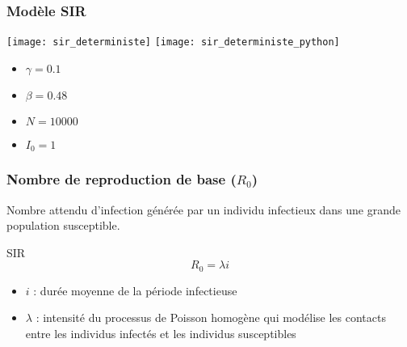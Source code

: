 \begin{frame}
        \frametitle{Modèle SIR}
			
		\centering

		\texttt{[image: sir\_deterministe]}
		\texttt{[image: sir\_deterministe\_python]}
	
		
        \begin{multicols}{2}
                \begin{itemize}
                        \item $\gamma = 0.1$
                        \item $\beta = 0.48$
                        \item $N = 10000$
                        \item $I_0 = 1$
                \end{itemize}
        \end{multicols}

\end{frame}

\begin{frame}
        \frametitle{Nombre de reproduction de base ($R_0$)}

        Nombre attendu d’infection générée par un individu infectieux dans une grande population susceptible.

        \begin{alertblock}{SIR}
                $$ R_0 =  \lambda i $$
        \end{alertblock}

        \begin{itemize}
                \item $i$ : durée moyenne de la période infectieuse
                \item $\lambda$ : intensité du processus de Poisson homogène qui modélise les contacts entre les individus infectés et les individus susceptibles
        \end{itemize}
\end{frame}

